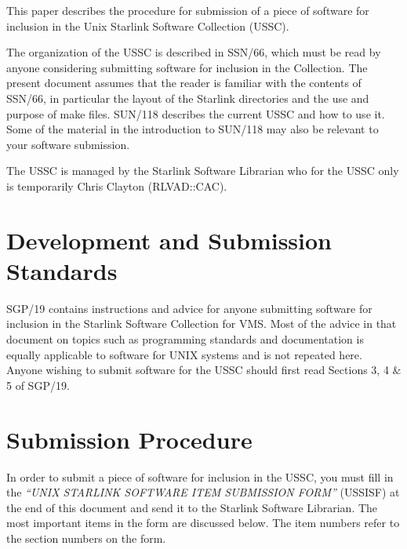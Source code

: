 This paper describes the procedure for submission of a piece of
software for inclusion in the Unix Starlink Software Collection (USSC).

The organization of the USSC is described
in SSN/66, which must be read by anyone considering submitting
software for inclusion in the Collection. The present document assumes that
the reader is familiar with the contents of SSN/66, in particular the
layout of the Starlink directories and the use and purpose of make files.
SUN/118 describes the current USSC and how to use it. Some of the material in
the introduction to SUN/118 may also be relevant to your software submission.

The USSC is managed by the Starlink Software Librarian who for the USSC only
is temporarily Chris Clayton (RLVAD::CAC).

\section {Development and Submission Standards}

SGP/19 contains instructions and advice for anyone submitting software for
inclusion in the Starlink Software Collection for VMS. Most of the advice in
that document on topics such as programming standards and documentation is
equally applicable to software for UNIX systems and is not repeated here.
Anyone wishing to submit software for the USSC should first read Sections 3, 4
\& 5 of SGP/19.

\section{Submission Procedure}

In order to submit a piece of software for inclusion in the USSC, you must fill
in the {\em ``UNIX STARLINK SOFTWARE ITEM SUBMISSION FORM''\/} (USSISF) at the
end of this document and send it to the Starlink Software Librarian. The most
important items in the form are discussed below. The item numbers refer to the
section numbers on  the form.

